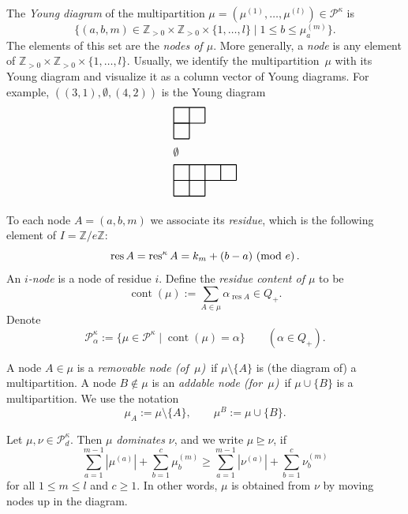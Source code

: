 \documentclass[twoside,11pt,reqno]{amsart}
\numberwithin{equation}{section}
\theoremstyle{definition}  %
\def\pmod#1{\text{ }(\text{\rm mod } #1)\,}
\newcommand{\res}{\operatorname{res}}
\newcommand{\cont}{\operatorname{cont}}
\newcommand{\Z}{\mathbb{Z}}
\newcommand{\0}{{\bar 0}}
\newcommand{\1}{{\bar 1}}
\newcommand{\La}{\Lambda}
\newcommand{\al}{\alpha}
\newcommand\Par[1][]{{\mathscr P}^{\kappa#1}}
\newcommand\YoungDiagram[2][\relax]{
  \begin{tikzpicture}[scale=0.5,draw/.append style={thick,black}]
    \ifx\relax#1\relax%
    \else %
    \foreach\box in {#1} {
      \filldraw[blue!30]\box rectangle ++(1,1);
    }
    \fi
    \newcount\row
    \row=0
    \foreach \col in {#2} {
       \draw(1,\the\row)grid ++(\col,1);
       \global\advance\row by -1
    }
  \end{tikzpicture}
}
\begin{document}
The {\em Young diagram} of the multipartition $\mu = (\mu^{(1)} , \dots,\mu^{(l)})\in \Par$ is 
$$
\{(a,b,m)\in\Z_{>0}\times\Z_{>0}\times \{1,\dots,l\}\mid 1\leq b\leq \mu_a^{(m)}\}.
$$
The elements of this set
are the {\em nodes of $\mu$}. More generally, a {\em node} is any element of $\Z_{>0}\times\Z_{>0}\times \{1,\dots,l\}$. 
Usually, we identify the multipartition~$\mu$ with its 
Young diagram and visualize it as a column vector of Young diagrams. 
For example, $((3,1),\emptyset,(4,2))$ is the Young diagram
\begin{align*}
&\YoungDiagram{2,1} \\ &\emptyset\\ &\YoungDiagram{4,2}
\end{align*}

To each node $A=(a,b,m)$ %
we associate its {\em residue}, which is the following element of $I=\Z/e\Z$: 
\begin{equation}\label{ERes}
\res A=\res^\kappa A=k_m+(b-a)\pmod{e}.
\end{equation}
An {\em $i$-node} is a node of residue $i$.
Define the {\em residue content of $\mu$} to be
\begin{equation}\label{EContent}
\cont(\mu):=\sum_{A\in\mu}\al_{\res A} \in Q_+.
\end{equation}
Denote
$$
\Par_\al:=\{\mu\in\Par\mid \cont(\mu)=\al\}\qquad(\al\in Q_+).
$$

A node $A\in\mu$ is a {\em removable node (of~$\mu$)}\, if $\mu\setminus \{A\}$ is (the diagram of) a multipartition. A node $B\not\in\mu$ is an {\em addable node (for~$\mu$)}\, if $\mu\cup \{B\}$ is a multipartition. We use the notation
$$
\mu_A:=\mu\setminus \{A\},\qquad \mu^B:=\mu\cup\{B\}.
$$





Let $\mu,\nu\in \Par_d$. Then $\mu$ {\em dominates} $\nu$, and we write $\mu\unrhd\nu$, if 
$$
\sum_{a=1}^{m-1}|\mu^{(a)}|+\sum_{b=1}^c\mu_b^{(m)}\geq 
\sum_{a=1}^{m-1}|\nu^{(a)}|+\sum_{b=1}^c\nu_b^{(m)}
$$
for all $1\leq m\leq l$ and $c\geq 1$.
In other words, $\mu$ is obtained from $\nu$ by moving nodes up in
the diagram.
\end{document}
